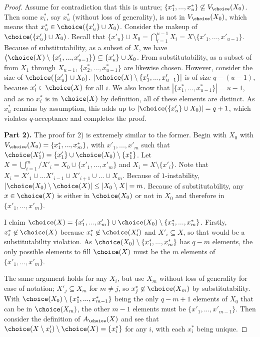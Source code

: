 \documentclass[10pt]{article}
\begin{document}
\begin{ReviewVerbatim}
\begin{proof}
Assume for contradiction that this is untrue; $\{x^*_1, ..., x^*_u\} \not\subseteq V_\choice(X_0)$. Then some $x^*_i$, say $x^*_u$ (without loss of generality), is not in $V_\choice(X_0)$, which means that $x^*_u \in \choice(\{x'_u\} \cup X_0)$.
Consider the makeup of $\choice(\{x'_u\} \cup X_0)$. Recall that $\{x'_u\} \cup X_0 = \bigcap_{i=1}^{u-1} X_i = X \setminus \{x'_1, ..., x'_{u-1}\}$. Because of substitutability, as a subset of $X$, we have $\left(\choice(X) \setminus \{x'_1, ..., x'_{u-1}\}\right) \subseteq \{x'_u\} \cup X_0$. From substitutability, as a subset of from $X_1$ through $X_{u-1}$, $\{x^*_2, ..., x^*_{u-1}\}$ are likewise chosen.
However, consider the size of $\choice(\{x'_u\} \cup X_0)$. $|\choice(X) \setminus \{x'_1, ..., x'_{u-1}\}|$ is of size $q-(u-1)$, because $x'_i \in \choice(X)$ for all $i$. We also know that $|\{x^*_1, ..., x^*_{u-1}\}| = u-1$, and as no  $x^*_i$ is in $\choice(X)$ by definition, all of these elements are distinct. As $x^*_u$ remains by assumption, this adds up to $|\choice(\{x'_u\} \cup X_0)| = q+1$, which violates $q$-acceptance and completes the proof.

\textbf{Part 2).}
The proof for 2) is extremely similar to the former. Begin with $X_0$ with $V_\choice(X_0) = \{x^*_1, ..., x^*_m\}$, with $x'_1, ..., x'_m$ such that $\choice(X'_1) = \{x'_1\} \cup \choice(X_0) \setminus \{x^*_1\}$. Let $X = \bigcup_{i=1}^m /X'_i = X_0 \cup \{x'_1,...,x'_m\}$ and $X_i = X \setminus \{x'_i\}$. Note that $X_i = X'_1 \cup ... X'_{i-1} \cup X'_{i+1} \cup ... \cup X_m$. %
Because of $1$-instability, $|\choice(X_0) \setminus \choice(X)| \leq |X_0 \setminus X| = m$. Because of substitutability, any $x \in \choice(X)$ is either in $\choice(X_0)$ or not in $X_0$ and therefore in $\{x'_1, ..., x'_m\}$.

I claim $\choice(X) = \{x'_1,...,x'_m\} \cup \choice(X_0) \setminus \{x^*_1,..., x^*_m\}$. Firstly, $x^*_i \not\in \choice(X)$ because  $x^*_i \not\in \choice(X'_i)$ and $X'_i \subseteq X$, so that would be a substitutability violation. As $\choice(X_0) \setminus \{x^*_1,..., x^*_m\}$ has $q-m$ elements, the only possible elements to fill $\choice(X)$ must be the $m$ elements of $\{x'_1,...,x'_m\}$.

The same argument holds for any $X_i$, but use $X_m$ without loss of generality for ease of notation; $X'_j \subseteq X_m$ for $m \neq j$, so $x^*_j \not\in\choice(X_m)$ by substitutability. With $\choice(X_0) \setminus \{x^*_1,..., x^*_{m-1}\}$ being the only $q-m+1$ elements of $X_0$ that can be in $\choice(X_m)$, the other $m-1$ elements must be $\{x'_1,. .., x'_{m-1}\}$. Then consider the definition of $A_\choice(X)$ and see that $\choice(X \setminus x'_i) \setminus \choice(X) = \{x^*_i\}$ for any $i$, with each $x^*_i$ being unique.
\end{proof}
\end{ReviewVerbatim}
\end{document}
